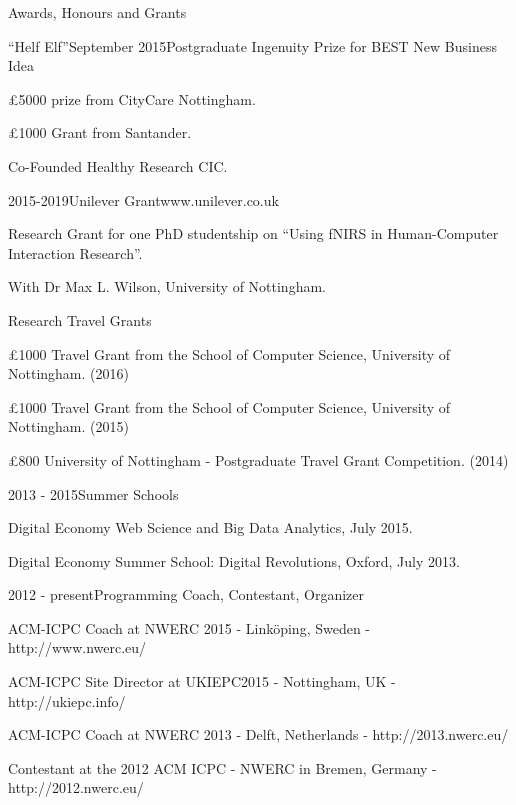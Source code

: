 \documentclass{resume} %
\begin{document}
\begin{rSection}{Awards, Honours and Grants}
    \begin{rSubsection}{``Helf Elf''}{September 2015}{Postgraduate Ingenuity Prize for BEST New Business Idea}{}
        \item \pounds 5000 prize from CityCare Nottingham.
        \item \pounds 1000 Grant from Santander.
        \item Co-Founded Healthy Research CIC.
    \end{rSubsection}
    \begin{rSubsection}{}{2015-2019}{Unilever Grant}{www.unilever.co.uk}
        \item Research Grant for one PhD studentship on ``Using fNIRS in Human-Computer Interaction Research''.
        \item With Dr Max L. Wilson, University of Nottingham.
    \end{rSubsection}
    \begin{rSubsection}{}{}{Research Travel Grants}{}
        \item \pounds 1000 Travel Grant from the School of Computer Science, University of Nottingham. (2016)
        \item \pounds 1000 Travel Grant from the School of Computer Science, University of Nottingham. (2015)
        \item \pounds 800 University of Nottingham - Postgraduate Travel Grant Competition. (2014)
    \end{rSubsection}
    \begin{rSubsection}{}{2013 - 2015}{Summer Schools}{}
        \item Digital Economy Web Science and Big Data Analytics, July 2015.
        \item Digital Economy Summer School: Digital Revolutions, Oxford, July 2013.
    \end{rSubsection}
    \begin{rSubsection}{}{2012 - present}{Programming Coach, Contestant, Organizer}{}
        \item  ACM-ICPC Coach at NWERC 2015 - Linköping, Sweden - {http://www.nwerc.eu/}
        \item  ACM-ICPC Site Director at UKIEPC2015 - Nottingham, UK - {http://ukiepc.info/}
        \item  ACM-ICPC Coach at NWERC 2013 - Delft, Netherlands  - {http://2013.nwerc.eu/}
        \item Contestant at the 2012 ACM ICPC - NWERC in Bremen, Germany - {http://2012.nwerc.eu/}
    \end{rSubsection}

\end{rSection}
\end{document}
